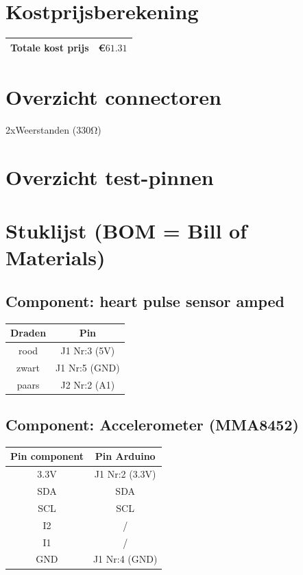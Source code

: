 \documentclass[a4paper]{report}
\begin{document}
    \section{Kostprijsberekening}
        \begin{tabular}{|c|c|}
            \hline
            Totale kost prijs & \euro $61.31$\\
            \hline
        \end{tabular}
        
    \section{Overzicht connectoren}
    2xWeerstanden (330Ω)
    
    \section{Overzicht test-pinnen}

    \section{Stuklijst (BOM = Bill of Materials)}
    
        \subsection{Component: heart pulse sensor amped}
            \begin{tabular}{|c|c|}
                \hline
                Draden & Pin\\
                \hline
                rood  & J1 Nr:3 (5V)\\
                zwart & J1 Nr:5 (GND)\\
                paars & J2 Nr:2 (A1)\\
                \hline
            \end{tabular}

        \subsection{Component: Accelerometer (MMA8452)}
            \begin{tabular}{|c|c|}
                \hline
                Pin component & Pin Arduino\\
                \hline
                3.3V & J1 Nr:2 (3.3V)\\
                SDA  & SDA\\
                SCL  & SCL\\
                I2   & /\\
                I1   & /\\
                GND  & J1 Nr:4 (GND)\\
                \hline
            \end{tabular}
            
\end{document}
